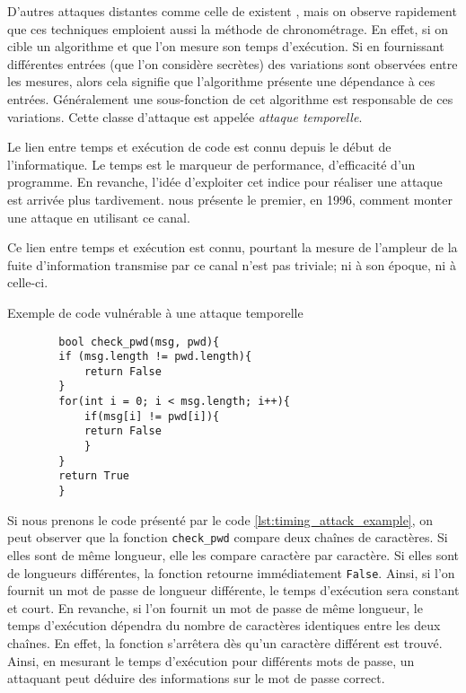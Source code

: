 D'autres attaques distantes comme celle de \citeauthor{LLC_attack} existent \cite{cryptoeprint:2016/224,Moghimi_2017,vanbulck2018nemesis}, mais on observe rapidement que ces techniques emploient aussi la méthode de chronométrage. En effet, si on cible un algorithme et que l'on mesure son temps d'exécution. Si en fournissant différentes entrées (que l'on considère secrètes) des variations sont observées entre les mesures, alors cela signifie que l'algorithme présente une dépendance à ces entrées. Généralement une sous-fonction de cet algorithme est responsable de ces variations. Cette classe d'attaque est appelée \textit{attaque temporelle}.\medbreak


Le lien entre temps et exécution de code est connu depuis le début de l'informatique. Le temps est le marqueur de performance, d'efficacité d'un programme. En revanche, l'idée d'exploiter cet indice pour réaliser une attaque est arrivée plus tardivement. \citeauthor{crypto-1996-1469} nous présente le premier, en 1996, comment monter une attaque en utilisant ce canal.\medbreak

Ce lien entre temps et exécution est connu, pourtant la mesure de l'ampleur de la fuite d'information transmise par ce canal n'est pas triviale; ni à son époque, ni à celle-ci.

\begin{listing}[!ht]
    \caption{Exemple de code vulnérable à une attaque temporelle}
    \label{lst:timing_attack_example}
    \begin{verbatim}
        bool check_pwd(msg, pwd){
        if (msg.length != pwd.length){
            return False
        }
        for(int i = 0; i < msg.length; i++){
            if(msg[i] != pwd[i]){
            return False
            }
        }
        return True
        }
    \end{verbatim}
\end{listing}
                
Si nous prenons le code présenté par le code \ref{lst:timing_attack_example}, on peut observer que la fonction \texttt{check\_pwd} compare deux chaînes de caractères. Si elles sont de même longueur, elle les compare caractère par caractère. Si elles sont de longueurs différentes, la fonction retourne immédiatement \texttt{False}. Ainsi, si l'on fournit un mot de passe de longueur différente, le temps d'exécution sera constant et court. En revanche, si l'on fournit un mot de passe de même longueur, le temps d'exécution dépendra du nombre de caractères identiques entre les deux chaînes. En effet, la fonction s'arrêtera dès qu'un caractère différent est trouvé. Ainsi, en mesurant le temps d'exécution pour différents mots de passe, un attaquant peut déduire des informations sur le mot de passe correct.\medbreak

